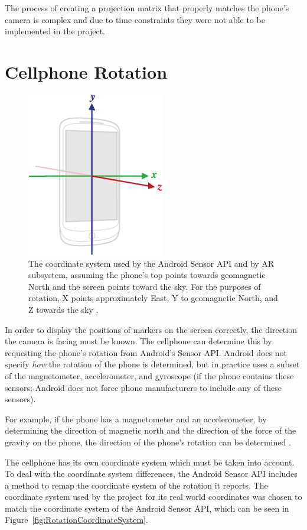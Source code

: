 The process of creating a projection matrix that properly matches the phone's camera is complex \cite{CalibratedCamera} and due to time constraints they were not able to be implemented in the project.

\section{Cellphone Rotation}
\begin{figure}
	\centering
	\includegraphics[width=6cm]{Figures/AxisDevice.png}
	\decoRule
	\caption{The coordinate system used by the Android Sensor API \cite{AndroidSensorDocsOverview} and by AR subsystem, assuming the phone's top points towards geomagnetic North and the screen points toward the sky. For the purposes of rotation, X points approximately East, Y to geomagnetic North, and Z towards the sky \cite{AndroidSensorDocs}.}
	\label{fig:CameraLens}
\end{figure}

In order to display the positions of markers on the screen correctly, the direction the camera is facing must be known. The cellphone can determine this by requesting the phone's rotation from Android's Sensor API. Android does not specify \emph{how} the rotation of the phone is determined, but in practice uses a subset of the magnetometer, accelerometer, and gyroscope (if the phone contains these sensors; Android does not force phone manufacturers to include any of these sensors). 

For example, if the phone has a magnetometer and an accelerometer, by determining the direction of magnetic north and the direction of the force of the gravity on the phone, the direction of the phone's rotation can be determined \cite{AndroidSensorDocs}.

The cellphone has its own coordinate system which must be taken into account. To deal with the coordinate system differences, the Android Sensor API includes a method to remap the coordinate system of the rotation it reports. The coordinate system used by the project for its real world coordinates was chosen to match the coordinate system of the Android Sensor API, which can be seen in Figure~\ref{fig:RotationCoordinateSystem}.

